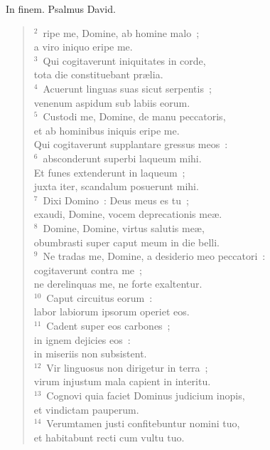 \bchapter[Psalm]
In finem. Psalmus David.
\begin{verse}${}^{2}$~ripe me, Domine, ab homine malo~;\\ a viro iniquo eripe me.\\
${}^{3}$~Qui cogitaverunt iniquitates in corde,\\ tota die constituebant pr\ae lia.\\
${}^{4}$~Acuerunt linguas suas sicut serpentis~;\\ venenum aspidum sub labiis eorum.\\
${}^{5}$~Custodi me, Domine, de manu peccatoris,\\ et ab hominibus iniquis eripe me.\\ Qui cogitaverunt supplantare gressus meos~:\\
${}^{6}$~absconderunt superbi laqueum mihi.\\ Et funes extenderunt in laqueum~;\\ juxta iter, scandalum posuerunt mihi.\\
${}^{7}$~Dixi Domino~: Deus meus es tu~;\\ exaudi, Domine, vocem deprecationis me\ae .\\
${}^{8}$~Domine, Domine, virtus salutis me\ae ,\\ obumbrasti super caput meum in die belli.\\
${}^{9}$~Ne tradas me, Domine, a desiderio meo peccatori~:\\ cogitaverunt contra me~;\\ ne derelinquas me, ne forte exaltentur.\\
${}^{10}$~Caput circuitus eorum~:\\ labor labiorum ipsorum operiet eos.\\
${}^{11}$~Cadent super eos carbones~;\\ in ignem dejicies eos~:\\ in miseriis non subsistent.\\
${}^{12}$~Vir linguosus non dirigetur in terra~;\\ virum injustum mala capient in interitu.\\
${}^{13}$~Cognovi quia faciet Dominus judicium inopis,\\ et vindictam pauperum.\\
${}^{14}$~Verumtamen justi confitebuntur nomini tuo,\\ et habitabunt recti cum vultu tuo.\end{verse}



